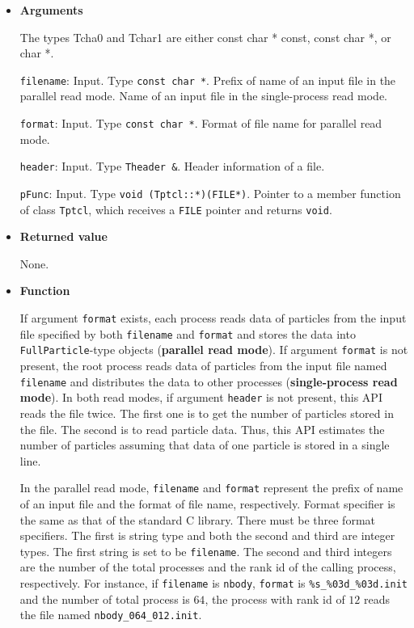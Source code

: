 \begin{itemize}

\item {\bf Arguments}

The types Tcha0 and Tchar1 are either const char * const, const char *, or char
*. 

\texttt{filename}: Input. Type \texttt{const char *}. Prefix of name of an input file in the parallel read mode. Name of an input file in the single-process read mode.

\texttt{format}: Input. Type \texttt{const char *}. Format of file name for parallel read mode.

\texttt{header}: Input. Type \texttt{Theader \&}. Header information of a file.

\texttt{pFunc}: Input. Type \texttt{void (Tptcl::*)(FILE*)}. Pointer to a member function of class \texttt{Tptcl}, which receives a \texttt{FILE} pointer and returns \texttt{void}.


\item {\bf Returned value}

None.

\item {\bf Function}

If argument \texttt{format} exists, each process reads data of particles from the input file specified by both \texttt{filename} and \texttt{format} and stores the data into \texttt{FullParticle}-type objects (\textbf{parallel read mode}). If argument \texttt{format} is not present, the root process reads data of particles from the input file named \texttt{filename} and distributes the data to other processes (\textbf{single-process read mode}). In both read modes, if argument \texttt{header} is not present, this API reads the file twice. The first one is to get the number of particles stored in the file. The second is to read particle data. Thus, this API estimates the number of particles assuming that data of one particle is stored in a single line.


In the parallel read mode, \texttt{filename} and \texttt{format} represent the prefix of name of an input file and the format of file name, respectively. Format specifier is the same as that of the standard C library. There must be three format specifiers. The first is string type and both the second and third are integer types. The first string is set to be \texttt{filename}. The second and third integers are the number of the total processes and the rank id of the calling process, respectively. For instance, if \texttt{filename} is \texttt{nbody}, \texttt{format} is \texttt{\%s\_\%03d\_\%03d.init} and the number of total process is $64$, the process with rank id of $12$ reads the file named \texttt{nbody\_064\_012.init}.


\end{itemize}
